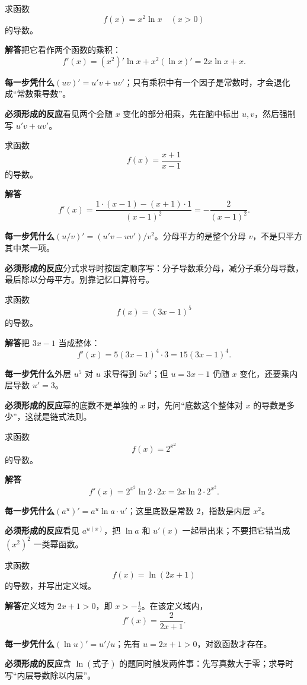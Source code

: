 \documentclass[11pt,fontset=fandol]{ctexart}
\newcommand{\answer}{\par\textbf{解答}\quad}
\newcommand{\basis}{\par\textbf{每一步凭什么}\quad}
\newcommand{\reaction}{\par\textbf{必须形成的反应}\quad}
\newenvironment{drill}[2]{
  \begin{tcolorbox}[colback=white,colframe=black!35,title={#1\quad\small #2},breakable]
}{\end{tcolorbox}}
\begin{document}
\begin{drill}{8. 乘积不能分别求导后相乘}{甲种本《微积分初步》乘法法则习题改编}
求函数
\[
f(x)=x^2\ln x\quad(x>0)
\]
的导数。

\answer 把它看作两个函数的乘积：
\[
f'(x)=(x^2)'\ln x+x^2(\ln x)'
=2x\ln x+x.
\]

\basis $(uv)'=u'v+uv'$；只有乘积中有一个因子是常数时，才会退化成“常数乘导数”。

\reaction 看见两个会随 $x$ 变化的部分相乘，先在脑中标出 $u,v$，然后强制写 $u'v+uv'$。
\end{drill}

\begin{drill}{9. 商法则的分母要整体平方}{甲种本《微积分初步》除法法则习题改编}
求函数
\[
f(x)=\frac{x+1}{x-1}
\]
的导数。

\answer
\[
f'(x)=\frac{1\cdot(x-1)-(x+1)\cdot1}{(x-1)^2}
=-\frac2{(x-1)^2}.
\]

\basis $(u/v)'=(u'v-uv')/v^2$。分母平方的是整个分母 $v$，不是只平方其中某一项。

\reaction 分式求导时按固定顺序写：分子导数乘分母，减分子乘分母导数，最后除以分母平方。别靠记忆口算符号。
\end{drill}

\begin{drill}{10. 复合函数先认内层}{甲种本《微积分初步》复合函数习题改编}
求函数
\[
f(x)=(3x-1)^5
\]
的导数。

\answer 把 $3x-1$ 当成整体：
\[
f'(x)=5(3x-1)^4\cdot3=15(3x-1)^4.
\]

\basis 外层 $u^5$ 对 $u$ 求导得到 $5u^4$；但 $u=3x-1$ 仍随 $x$ 变化，还要乘内层导数 $u'=3$。

\reaction 幂的底数不是单独的 $x$ 时，先问“底数这个整体对 $x$ 的导数是多少”，这就是链式法则。
\end{drill}

\begin{drill}{11. 指数的底数和指数不要混淆}{人教B版初等函数导数题型改编}
求函数
\[
f(x)=2^{x^2}
\]
的导数。

\answer
\[
f'(x)=2^{x^2}\ln2\cdot2x=2x\ln2\cdot2^{x^2}.
\]

\basis $(a^u)'=a^u\ln a\cdot u'$；这里底数是常数 $2$，指数是内层 $x^2$。

\reaction 看见 $a^{u(x)}$，把 $\ln a$ 和 $u'(x)$ 一起带出来；不要把它错当成 $(x^2)^2$ 一类幂函数。
\end{drill}

\begin{drill}{12. 对数复合也要乘内层导数}{人教B版初等函数导数题型改编}
求函数
\[
f(x)=\ln(2x+1)
\]
的导数，并写出定义域。

\answer 定义域为 $2x+1>0$，即 $x>-\frac12$。在该定义域内，
\[
f'(x)=\frac{2}{2x+1}.
\]

\basis $(\ln u)'=u'/u$；先有 $u=2x+1>0$，对数函数才存在。

\reaction 含 $\ln(\text{式子})$ 的题同时触发两件事：先写真数大于零；求导时写“内层导数除以内层”。
\end{drill}
\end{document}
